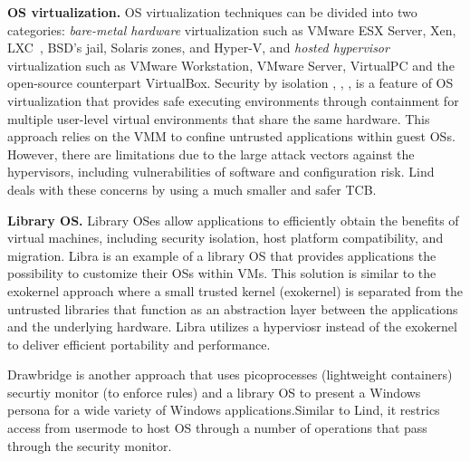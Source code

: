 

\textbf{OS virtualization.}
OS virtualization techniques can be divided into two categories:
\textit{bare-metal hardware} virtualization such as VMware ESX Server, Xen,
LXC~\cite{LXC}, BSD’s jail, Solaris zones, and Hyper-V, and
\textit{hosted hypervisor} virtualization such as VMware
Workstation, VMware Server, VirtualPC and the open-source counterpart
VirtualBox.
%
Security by isolation \cite{Qubes}, \cite{Overshadow},
\cite{SecureVM}, \cite{HypSec} is a feature of OS virtualization that
provides safe executing environments through containment for multiple
user-level virtual environments that share the same hardware. This
approach relies on the VMM to confine untrusted applications within
guest OSs. However, there are limitations due to
the large attack vectors against the hypervisors, including
vulnerabilities of software and configuration risk.
Lind deals with these concerns by using a much smaller and safer TCB.

\textbf{Library OS.}
Library OSes allow applications to efficiently
obtain the benefits of virtual machines,
including security isolation, host platform compatibility, and
migration. Libra \cite {Libra} is an example of a library OS that provides applications the possibility to customize their OSs within VMs. This solution is similar to the exokernel approach where a small trusted kernel (exokernel) is separated from the untrusted libraries that function as an abstraction layer between the applications and the underlying hardware. Libra utilizes a hyperviosr instead of the exokernel to deliver efficient portability and performance.

Drawbridge \cite{Drawbridge-11} is another approach that uses picoprocesses (lightweight containers) securtiy monitor (to enforce rules) and a library OS to present a Windows persona for a wide variety of Windows applications.Similar to Lind, it restrics access from usermode to host OS through a number of operations that pass through the security monitor. 

